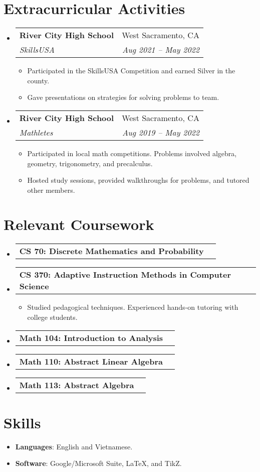 \documentclass[letterpaper,11pt]{article}
\makeatletter
\newcommand{\resumeItem}[2]{
	\item\small{
		\textbf{#1}{: #2 \vspace{-2pt}}
	}
}
\newcommand{\resumeItemTwo}[1]{
	\item\small{
		#1 \vspace{-2pt}}
}
\newcommand{\resumeSubheading}[4]{
	\vspace{-1pt}\item
	\begin{tabular*}{0.97\textwidth}[t]{l@{\extracolsep{\fill}}r}
		\textbf{#1} & #2 \\
		\textit{#3} & \textit{\small #4} \\
	\end{tabular*}\vspace{-5pt}
}
\newcommand{\resumeSubheadingFour}[1]{
	\vspace{-1pt}\item
	\begin{tabular*}{0.97\textwidth}[t]{l@{\extracolsep{\fill}}r}
		\textbf{#1} \\
	\end{tabular*}\vspace{-5pt}
}
\newcommand{\resumeSubHeadingListStart}{\begin{itemize}[leftmargin=*]}
\newcommand{\resumeSubHeadingListEnd}{\end{itemize}}
\newcommand{\resumeItemListStart}{\begin{itemize}}
\newcommand{\resumeItemListEnd}{\end{itemize}\vspace{-5pt}}
\makeatother
\begin{document}
	\section{Extracurricular Activities}
	\resumeSubHeadingListStart
	\resumeSubheading{River City High School}{West Sacramento, CA}{SkillsUSA}{Aug 2021 -- May 2022}
	\resumeItemListStart
	\resumeItemTwo{Participated in the SkillsUSA Competition and earned Silver in the county.}
	\resumeItemTwo{Gave presentations on strategies for solving problems to team.}
	\resumeItemListEnd
	
	\resumeSubheading{River City High School}{West Sacramento, CA}{Mathletes}{Aug 2019 -- May 2022}
	\resumeItemListStart
	\resumeItemTwo{Participated in local math competitions. Problems involved algebra, geometry, trigonometry, and precalculus.}
	\resumeItemTwo{Hosted study sessions, provided walkthroughs for problems, and tutored other members.}
	\resumeItemListEnd
	\resumeSubHeadingListEnd
	
	\section{Relevant Coursework}
	\resumeSubHeadingListStart
	
	\resumeSubheadingFour{CS 70: Discrete Mathematics and Probability}
	
	\resumeSubheadingFour{CS 370: Adaptive Instruction Methods in Computer Science}
	\resumeItemListStart
	\resumeItemTwo{Studied pedagogical techniques. Experienced hands-on tutoring with college students.}
	\resumeItemListEnd
	
	\resumeSubheadingFour{Math 104: Introduction to Analysis}
	
	\resumeSubheadingFour{Math 110: Abstract Linear Algebra}
	
	\resumeSubheadingFour{Math 113: Abstract Algebra}
	\resumeSubHeadingListEnd
	
	\section{Skills}
	\resumeSubHeadingListStart
	\resumeItem{Languages}{English and Vietnamese.}
	\resumeItem{Software}{Google/Microsoft Suite, LaTeX, and TikZ.}
	\resumeSubHeadingListEnd
\end{document}
